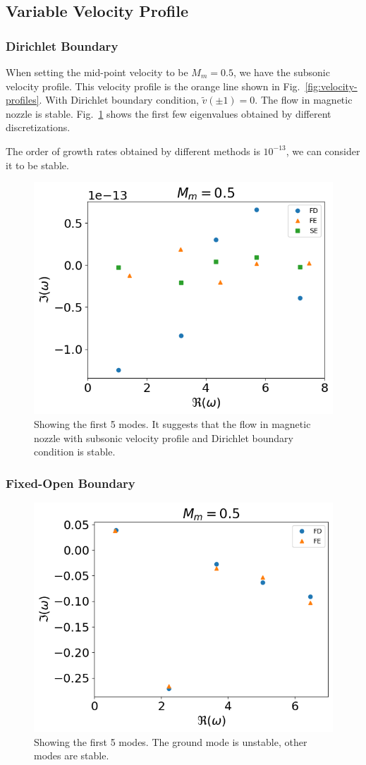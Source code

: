 \subsection{Variable Velocity Profile}
\subsubsection*{Dirichlet Boundary}
When setting the mid-point velocity to be $M_m=0.5$, we have the subsonic velocity profile. This velocity profile is the orange line shown in Fig.~\ref{fig:velocity-profiles}. With Dirichlet boundary condition, $\tilde{v}(\pm 1) =0$. The flow in magnetic nozzle is stable. Fig.~\ref{fig:subsonic-v-dirichlet} shows the first few eigenvalues obtained by different discretizations.

The order of growth rates obtained by different methods is $10^{-13}$, we can consider it to be stable.
\begin{figure} [H]
	\centering
	\includegraphics[width=0.7\linewidth]{figures/fixed-fixed-subsonic-v}
	\caption{Showing the first 5 modes. It suggests that the flow in magnetic nozzle with subsonic velocity profile and Dirichlet boundary condition is stable.}
	\label{fig:subsonic-v-dirichlet}
\end{figure}

\subsubsection*{Fixed-Open Boundary}
\begin{figure} [H]
	\centering
	\includegraphics[width=0.7\linewidth]{figures/fixed-open-subsonic-v}
	\caption{Showing the first 5 modes. The ground mode is unstable, other modes are stable.}
	\label{fig:subsonic-v-fixed_open}
\end{figure}


